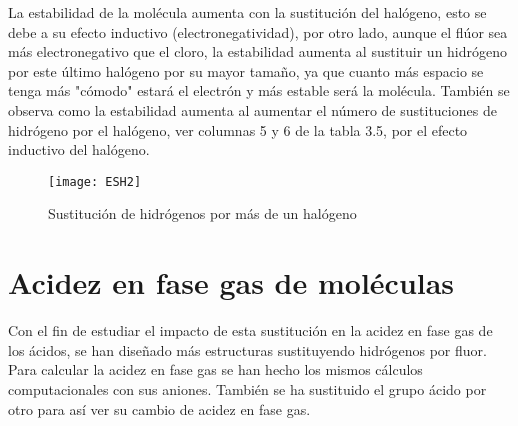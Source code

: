 La estabilidad de la molécula aumenta con la sustitución del halógeno, esto se debe a su efecto inductivo (electronegatividad), por otro lado, aunque el flúor sea más electronegativo que el cloro, la estabilidad aumenta al sustituir un hidrógeno por este último halógeno por su mayor tamaño, ya que cuanto más espacio se tenga más "cómodo" estará el electrón y más estable será la molécula.
También se observa como la estabilidad aumenta al aumentar el número de sustituciones de hidrógeno por el halógeno, ver columnas 5 y 6 de la tabla 3.5, por el efecto inductivo del halógeno.



\begin{figure}[h]
	\centering
	\texttt{[image: ESH2]}
	\caption{Sustitución de hidrógenos por más de un halógeno }
\end{figure}

\section{Acidez en fase gas de moléculas}

Con el fin de estudiar el impacto de esta sustitución en la acidez en fase gas de los ácidos, se han diseñado más estructuras sustituyendo hidrógenos por fluor. Para calcular la acidez en fase gas se han hecho los mismos cálculos computacionales con sus aniones.
También se ha sustituido el grupo ácido por otro para así ver su cambio de acidez en fase gas.

